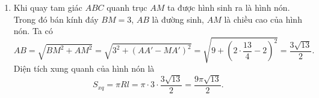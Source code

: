\begin{ex}
{\begin{enumerate}
		Ta lại có $\widehat{KAM}=\widehat{KCM}$ (cùng chắn cung $KM$) suy ra $\widehat{KAM}+\widehat{OAC} = \widehat{KCM}+\widehat{OCA} $ hay $\widehat{KAC}=\widehat{MCA}$. Do đó hình thang $AKMC$ có hai góc ở đáy bằng nhau nên là hình thang cân.
		\item Khi quay tam giác $ABC$ quanh trục $AM$ ta được hình sinh ra là hình nón. Trong đó bán kính đáy $BM=3$, $AB$ là đường sinh, $AM $ là chiều cao của hình nón. Ta có $$AB = \sqrt{BM^2 + AM^2} = \sqrt{3^2 + (AA'-MA')^2} = \sqrt{9 + \left( 2 \cdot \dfrac{13}{4} -2 \right) ^2} = \dfrac{3 \sqrt{13}}{2}.$$
		Diện tích xung quanh của hình nón là
		$$S_{xq} = \pi R l = \pi \cdot 3 \cdot \dfrac{3 \sqrt{13}}{2} =\dfrac{9 \pi \sqrt{13}}{2}  . $$
	\end{enumerate} }
\end{ex}

